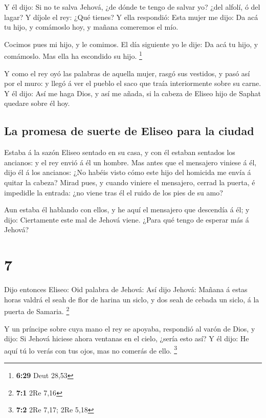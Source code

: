  Y él dijo: Si no te salva Jehová, ¿de dónde te tengo de
salvar yo? ¿del alfolí, ó del lagar?  Y díjole el rey: ¿Qué
tienes? Y ella respondió: Esta mujer me dijo: Da acá tu hijo, y
comámoslo hoy, y mañana comeremos el mío.

 Cocimos pues mi hijo, y le comimos. El día siguiente yo le
dije: Da acá tu hijo, y comámoslo. Mas ella ha escondido su hijo.
\footnote{\textbf{6:29} Deut 28,53}

 Y como el rey oyó las palabras de aquella mujer, rasgó sus
vestidos, y pasó así por el muro: y llegó á ver el pueblo el saco que
traía interiormente sobre su carne.  Y él dijo: Así me haga
Dios, y así me añada, si la cabeza de Eliseo hijo de Saphat quedare
sobre él hoy.

\hypertarget{la-promesa-de-suerte-de-eliseo-para-la-ciudad}{%
\subsection{La promesa de suerte de Eliseo para la
ciudad}\label{la-promesa-de-suerte-de-eliseo-para-la-ciudad}}

 Estaba á la sazón Eliseo sentado en su casa, y con él
estaban sentados los ancianos: y el rey envió á él un hombre. Mas antes
que el mensajero viniese á él, dijo él á los ancianos: ¿No habéis visto
cómo este hijo del homicida me envía á quitar la cabeza? Mirad pues, y
cuando viniere el mensajero, cerrad la puerta, é impedidle la entrada:
¿no viene tras él el ruido de los pies de su amo?

 Aun estaba él hablando con ellos, y he aquí el mensajero
que descendía á él; y dijo: Ciertamente este mal de Jehová viene. ¿Para
qué tengo de esperar más á Jehová?

\hypertarget{section-6}{%
\section{7}\label{section-6}}

 Dijo entonces Eliseo: Oid palabra de Jehová: Así dijo
Jehová: Mañana á estas horas valdrá el seah de flor de harina un siclo,
y dos seah de cebada un siclo, á la puerta de Samaria. \footnote{\textbf{7:1}
  2Re 7,16}

 Y un príncipe sobre cuya mano el rey se apoyaba, respondió
al varón de Dios, y dijo: Si Jehová hiciese ahora ventanas en el cielo,
¿sería esto así? Y él dijo: He aquí tú lo verás con tus ojos, mas no
comerás de ello. \footnote{\textbf{7:2} 2Re 7,17; 2Re 5,18}


